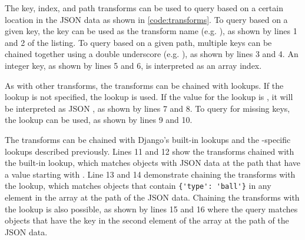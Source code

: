 \noindent
\begin{minipage}{\linewidth}

\end{minipage}

The key, index, and path transforms can be used to query based on a certain
location in the JSON data as shown in \autoref{code:transforms}. To query based
on a given key, the key can be used as the transform name (e.g.
), as shown by lines 1 and 2 of the listing. To query based
on a given path, multiple keys can be chained together using a double
underscore (e.g. ), as shown by lines 3 and 4. An
integer key, as shown by lines 5 and 6, is interpreted as an array index.

As with other transforms, the  transforms can be chained with
lookups. If the lookup is not specified, the  lookup is used. If
the value for the  lookup is , it will be interpreted as
JSON , as shown by lines 7 and 8. To query for missing keys, the
 lookup can be used, as shown by lines 9 and 10.

The transforms can be chained with Django's built-in lookups and the
-specific lookups described previously. Lines 11 and 12 show
the transforms chained with the built-in  lookup, which
matches objects with JSON data at the path  that have a value
starting with . Line 13 and 14 demonstrate chaining the transforms
with the  lookup, which matches objects that contain
\verb|{'type': 'ball'}| in any element in the array at the path
 of the JSON data. Chaining the transforms with the
 lookup is also possible, as shown by lines 15 and 16 where the
query matches objects that have the key  in the second element of
the array at the  path of the JSON data.

